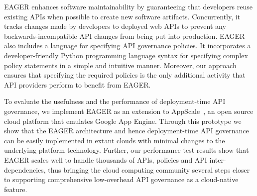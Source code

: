 EAGER enhances software maintainability by guaranteeing that 
developers reuse existing APIs when possible to create new software artifacts. 
Concurrently, it
tracks changes made by developers to deployed web APIs to prevent
any backwards-incompatible API changes from being put into production.
EAGER also includes a language for specifying 
API governance policies.  It incorporates a developer-friendly 
Python programming language syntax for 
specifying complex policy statements in a simple and 
intuitive manner. Moreover, our approach ensures that specifying the required policies 
is the only additional activity that API providers perform 
to benefit from EAGER.

To evaluate the usefulness and the performance of deployment-time API governance, 
we implement EAGER as an extension to AppScale~\cite{appscale13}, 
an open source cloud platform that emulates Google App Engine. Through this
prototype we show that the EAGER 
architecture and hence deployment-time API governance can be easily implemented 
in extant clouds with minimal changes to the underlying platform technology. Further,
our performance test results show that EAGER scales well to handle thousands of APIs,
policies and API inter-dependencies, thus bringing the cloud computing community several
steps closer to supporting comprehensive low-overhead API governance
as a cloud-native feature.

